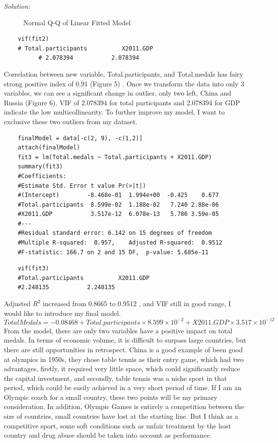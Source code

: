 \documentclass{article}
\newenvironment{solution}
    {\textit{Solution:}}
    {}
\begin{document}
\begin{solution}
\begin{figure}[h]
		\caption{Normal Q-Q of Linear Fitted Model}
	\end{figure}
	\begin{lstlisting}
	vif(fit2)
	# Total.participants          X2011.GDP 
          # 2.078394           2.078394 
	\end{lstlisting}
Correlation between new variable, Total.participants, and Total.medals has fairy strong positive index of 0.91 (Figure 5) . Once we transform the data into only 3 variables, we can see a significant change in outlier, only two left, China and Russia (Figure 6). VIF of 2.078394 for total participants and 2.078394 for GDP indicate the low multicollinearity.
\newline
To further improve my model, I want to exclusive these two outliers from my dataset.
	\begin{lstlisting}
	finalModel = data[-c(2, 9), -c(1,2)]
	attach(finalModel)
	fit3 = lm(Total.medals ~ Total.participants + X2011.GDP)
	summary(fit3)
	#Coefficients:
	#Estimate Std. Error t value Pr(>|t|)    
	#(Intercept)        -8.468e-01  1.994e+00  -0.425    0.677    
	#Total.participants  8.599e-02  1.188e-02   7.240 2.88e-06 
	#X2011.GDP           3.517e-12  6.078e-13   5.786 3.59e-05 
	#---
	#Residual standard error: 6.142 on 15 degrees of freedom
	#Multiple R-squared:  0.957,	Adjusted R-squared:  0.9512 
	#F-statistic: 166.7 on 2 and 15 DF,  p-value: 5.685e-11
	\end{lstlisting}
	\begin{lstlisting}
	vif(fit3)
	#Total.participants          X2011.GDP 
	#2.248135           2.248135 
	\end{lstlisting}
Adjusted $R^2$ increased from 	0.8665 to 0.9512 , and VIF still in good range, I would like to introduce my final model.
\begin{equation}
	Total Medals = -0.08468 + Total.participants\times 8.599\times 10^{-2} + X2011.GDP\times 3.517\times 10^{-12}
\end{equation}
\newline
From the model, there are only two variables have a positive impact on total medals. In terms of economic volume, it is difficult to surpass large countries, but there are still opportunities in retrospect. China is a good example of been good at olympics in 1950s, they chose table tennis as their entry game, which had two advantages, firstly, it required very little space, which could significantly reduce the capital investment, and secondly, table tennis was a niche sport in that period, which could be easily achieved in a very short period of time. If I am an Olympic coach for a small country, these two points will be my primary consideration.
\newline
In addition, Olympic Games is entirely a competition between the size of countries, small countries have lost at the starting line. But I think as a competitive sport, some soft conditions such as unfair treatment by the host country and drug abuse should be taken into account as performance.
\end{solution}
\end{document}
